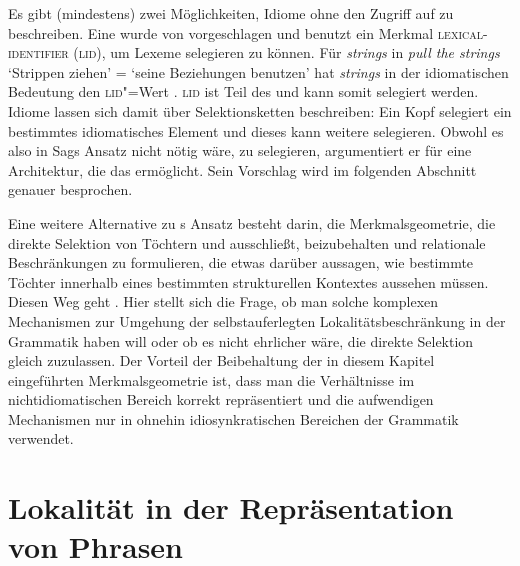 Es gibt (mindestens) zwei Möglichkeiten, Idiome ohne den Zugriff auf \phon zu beschreiben. Eine
wurde von \citet[Abschnitt~5.4]{Sag2007a} vorgeschlagen und benutzt ein Merkmal \textsc{lexical-identifier} (\textsc{lid}), um Lexeme selegieren
zu können. Für \emph{strings} in \emph{pull the strings} `Strippen ziehen' = `seine Beziehungen benutzen' hat
\emph{strings} in der idiomatischen Bedeutung den \textsc{lid}"=Wert
\mbox{}. \textsc{lid} ist Teil des \catwes und kann somit selegiert werden. Idiome
lassen sich damit über Selektionsketten beschreiben: Ein Kopf selegiert ein bestimmtes idiomatisches
Element und dieses kann weitere selegieren. Obwohl es also in Sags Ansatz nicht nötig wäre, \phon zu
selegieren, argumentiert er für eine Architektur, die das ermöglicht. Sein Vorschlag wird im folgenden
Abschnitt genauer besprochen.

Eine weitere Alternative zu \citeauthor{KE94a}s Ansatz besteht darin, die Merkmalsgeometrie, die direkte Selektion von Töchtern und \phon
ausschließt, beizubehalten und relationale Beschränkungen zu formulieren, die etwas darüber
aussagen, wie bestimmte Töchter innerhalb eines bestimmten strukturellen Kontextes aussehen
müssen. Diesen Weg geht \zb \citet{Sailer2000a}. Hier stellt sich die Frage, ob man solche
komplexen Mechanismen zur Umgehung der selbstauferlegten Lokalitätsbeschränkung
in der Grammatik haben will oder ob es nicht ehrlicher wäre, die direkte Selektion gleich zuzulassen.
Der Vorteil der Beibehaltung der in diesem Kapitel eingeführten Merkmalsgeometrie ist, dass
man die Verhältnisse im nichtidiomatischen Bereich korrekt repräsentiert und die aufwendigen
Mechanismen nur in ohnehin idiosynkratischen Bereichen der Grammatik verwendet.%


\section{Lokalität in der Repräsentation von Phrasen}

